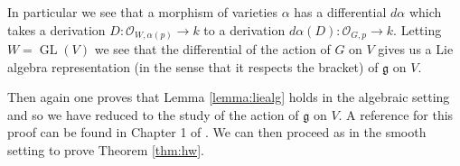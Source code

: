 \documentclass{amsart}
\newcommand{\cO}{{\mathcal{O}}}
\DeclareMathOperator{\GL}{GL}
\newcommand{\mf}[1]{\mathfrak{#1}}
\numberwithin{equation}{section}
\theoremstyle{plain} %
\theoremstyle{definition}
\theoremstyle{remark}
\begin{document}
\hfill

In particular we see that a morphism of varieties $\alpha$ has a differential $d\alpha$ which takes
a derivation $D:\cO_{W,\alpha(p)}\to k$ to a derivation $d\alpha(D):\cO_{G,p}\to k$. Letting $W = \GL(V)$
we see that the differential of the action of $G$ on $V$ gives us a Lie algebra representation (in the sense that
it respects the bracket) of $\mf g$ on $V$.

\hfill

Then again one proves that Lemma \ref{lemma:liealg} holds in the algebraic setting and
so we have reduced to the study of the action of $\mf g$ on $V$. A reference for this
proof can be found in Chapter 1 of \cite{borel}.
We can then proceed as in the smooth setting to prove Theorem \ref{thm:hw}.


{}

\end{document}
